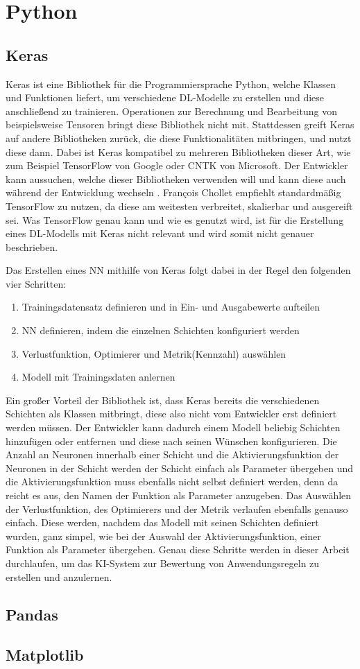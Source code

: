 \section{Python}
\label{chap:Python}


\subsection{Keras}
Keras ist eine Bibliothek für die Programmiersprache Python, welche Klassen und Funktionen liefert, um verschiedene \ac{DL}-Modelle zu erstellen
und diese anschließend zu trainieren. Operationen zur Berechnung und Bearbeitung von beispielsweise Tensoren bringt diese Bibliothek nicht mit.
Stattdessen greift Keras auf andere Bibliotheken zurück, die diese Funktionalitäten mitbringen, und nutzt diese dann. Dabei ist Keras kompatibel zu mehreren
Bibliotheken dieser Art, wie zum Beispiel TensorFlow von Google oder CNTK von Microsoft. Der Entwickler kann aussuchen, welche dieser Bibliotheken
verwenden will und kann diese auch während der Entwicklung wechseln \cite[vgl. S.89ff.]{DL_PY}. François Chollet empfiehlt standardmäßig TensorFlow zu nutzen, da diese 
\glqq am weitesten verbreitet, skalierbar und ausgereift\grqq{}\cite[S.91]{DL_PY} sei. Was TensorFlow genau kann und wie es genutzt wird, ist für die Erstellung eines
\ac{DL}-Modells mit Keras nicht relevant und wird somit nicht genauer beschrieben.

Das Erstellen eines \ac{NN} mithilfe von Keras folgt dabei in der Regel den folgenden vier Schritten:
\begin{enumerate}
    \item Trainingsdatensatz definieren und in Ein- und Ausgabewerte aufteilen \cite[vgl. S.92.]{DL_PY}
    \item \ac{NN} definieren, indem die einzelnen Schichten konfiguriert werden \cite[vgl. S.92.]{DL_PY}
    \item Verlustfunktion, Optimierer und Metrik(Kennzahl) auswählen \cite[vgl. S.92.]{DL_PY}
    \item Modell mit Trainingsdaten anlernen \cite[vgl. S.92.]{DL_PY}
\end{enumerate}
Ein großer Vorteil der Bibliothek ist, dass Keras bereits die verschiedenen Schichten als Klassen mitbringt, diese also nicht vom Entwickler erst definiert werden müssen.
Der Entwickler kann dadurch einem Modell beliebig Schichten hinzufügen oder entfernen und diese nach seinen Wünschen konfigurieren. 
Die Anzahl an Neuronen innerhalb einer Schicht und die Aktivierungsfunktion der Neuronen in der Schicht werden der Schicht einfach als Parameter übergeben 
und die Aktivierungsfunktion muss ebenfalls nicht selbst definiert werden, denn da reicht es aus, den Namen der Funktion als Parameter anzugeben.
Das Auswählen der Verlustfunktion, des Optimierers und der Metrik verlaufen ebenfalls genauso einfach. Diese werden, nachdem das Modell mit seinen Schichten 
definiert wurden, ganz simpel, wie bei der Auswahl der Aktivierungsfunktion, einer Funktion als Parameter übergeben.
Genau diese Schritte werden in dieser Arbeit durchlaufen, um das \ac{KI}-System zur Bewertung von Anwendungsregeln zu erstellen und anzulernen.

\subsection{Pandas}

\subsection{Matplotlib}
